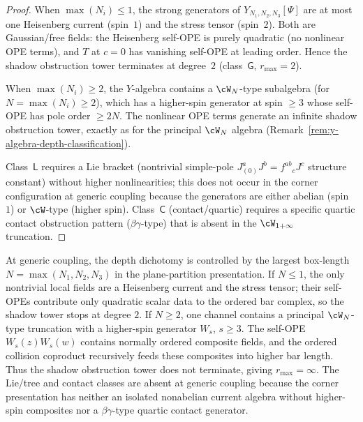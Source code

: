 \begin{proof}
When $\max(N_i) \leq 1$, the strong generators of
$Y_{N_1,N_2,N_3}[\Psi]$ are at most one Heisenberg current
(spin~$1$) and the stress tensor (spin~$2$). Both are
Gaussian/free fields: the Heisenberg self-OPE is purely quadratic
(no nonlinear OPE terms), and $T$ at $c = 0$ has vanishing
self-OPE at leading order. Hence the shadow obstruction tower
terminates at degree~$2$ (class~$\mathsf{G}$,
$r_{\max} = 2$).

When $\max(N_i) \geq 2$, the $Y$-algebra contains a
$\cW_N$-type subalgebra (for $N = \max(N_i) \geq 2$), which
has a higher-spin generator at spin $\geq 3$ whose self-OPE
has pole order $\geq 2N$. The nonlinear
OPE terms generate an infinite shadow obstruction tower, exactly
as for the principal $\cW_N$ algebra
(Remark~\ref{rem:y-algebra-depth-classification}).

Class~$\mathsf{L}$ requires a Lie bracket (nontrivial simple-pole
$J^a_{(0)} J^b = f^{ab}{}_c J^c$ structure constant) without
higher nonlinearities; this does not occur in the corner
configuration at generic coupling because the generators are
either abelian (spin~$1$) or $\cW$-type (higher spin).
  Class~$\mathsf{C}$ (contact/quartic) requires a specific quartic
  contact obstruction pattern ($\beta\gamma$-type) that is absent
  in the $\cW_{1+\infty}$ truncation.
  \end{proof}

  \begin{remark}%
  \label{rem:y-algebra-depth-classification}%
  \ClaimStatusProvedHere%
  At generic coupling, the depth dichotomy is controlled by the
  largest box-length \(N=\max(N_1,N_2,N_3)\) in the plane-partition
  presentation. If \(N\leq1\), the only nontrivial local fields are a
  Heisenberg current and the stress tensor; their self-OPEs contribute
  only quadratic scalar data to the ordered bar complex, so the shadow
  tower stops at degree \(2\). If \(N\geq2\), one channel contains a
  principal \(\cW_N\)-type truncation with a higher-spin generator
  \(W_s\), \(s\geq3\). The self-OPE \(W_s(z)W_s(w)\) contains
  normally ordered composite fields, and the ordered collision
  coproduct recursively feeds these composites into higher bar length.
  Thus the shadow obstruction tower does not terminate, giving
  \(r_{\max}=\infty\). The Lie/tree and contact classes are absent at
  generic coupling because the corner presentation has neither an
  isolated nonabelian current algebra without higher-spin composites
  nor a \(\beta\gamma\)-type quartic contact generator.
  \end{remark}

